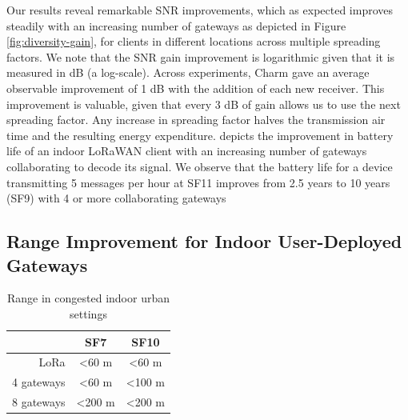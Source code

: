 Our results reveal remarkable SNR improvements, which as expected improves
steadily with an increasing number of gateways as depicted in Figure
\ref{fig:diversity-gain}, for clients in different locations across multiple
spreading factors. We note that the SNR gain improvement is logarithmic given
that it is measured in dB (a log-scale). Across experiments, Charm gave an
average observable improvement of 1 dB with the addition of each new receiver.
This improvement is valuable, given that every 3 dB of gain allows us to use
the next spreading factor. Any increase in spreading factor halves the
transmission air time and the resulting energy expenditure.
 depicts the improvement in battery life of an
indoor LoRaWAN client with an increasing number of gateways collaborating to
decode its signal. We observe that the battery life for a device transmitting
5 messages per hour at SF11 improves from 2.5 years to 10 years (SF9) with 4
or more collaborating gateways


\subsection{Range Improvement for Indoor User-Deployed Gateways}

\begin{table}[t]
\centering
\begin{tabular}{r|c|c|}
\cline{2-3}
\multicolumn{1}{l|}{}            & SF7            & SF10           \\ \hline
\multicolumn{1}{|r|}{LoRa}       & \textless60 m  & \textless60 m  \\ \hline
\multicolumn{1}{|r|}{4 gateways} & \textless60 m  & \textless100 m \\ \hline
\multicolumn{1}{|r|}{8 gateways} & \textless200 m & \textless200 m \\ \hline
\end{tabular}
\caption{Range in congested indoor urban settings}
\label{tab:range}
\compactimg
\compactimg
\end{table}

